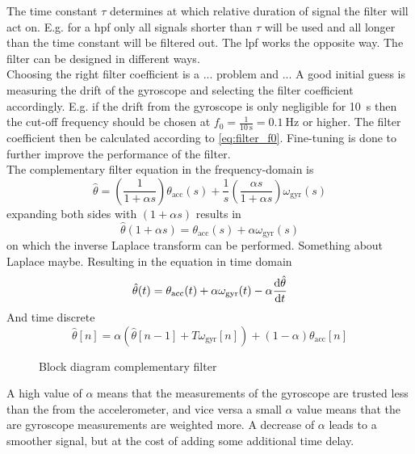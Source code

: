 The time constant $\tau$ determines at which relative duration of signal the filter will act on.
E.g. for a \gls{hpf} only all signals shorter than $\tau$ will be used and all longer than the time constant will be filtered out.
The \gls{lpf} works the opposite way.
The filter can be designed in different ways.\\
Choosing the right filter coefficient is a ... problem and ...
A good initial guess is measuring the drift of the gyroscope and selecting the filter coefficient accordingly.
E.g. if the drift from the gyroscope is only negligible for \SI{10}{\second} then the cut-off frequency should be chosen at $f_0 = \frac{1}{\SI{10}{\second}} = \SI{0.1}{\hertz}$ or higher.
The filter coefficient then be calculated according to \cref{eq:filter_f0}.
Fine-tuning is done to further improve the performance of the filter.\\
The complementary filter equation in the frequency-domain is
\begin{equation}
    \label{eq:compl_filt_f}
    \hat{\theta} = \left(\frac{1}{1 + \alpha s}\right)\theta_\mathrm{acc}(s) + \frac{1}{s}\left(\frac{\alpha s}{1 + \alpha s}\right) \omega_\mathrm{gyr}(s)
\end{equation}
expanding both sides with $(1 + \alpha s)$ results in
\begin{equation}
    \hat{\theta}(1 + \alpha s) = \theta_\mathrm{acc}(s) + \alpha\omega_\mathrm{gyr}(s)
\end{equation}
on which the inverse Laplace transform can be performed.
Something about Laplace maybe.
Resulting in the equation in time domain
\begin{equation}
    \hat{\theta}(t) = \theta_\mathrm{acc}(t) + \alpha\omega_\mathrm{gyr}(t) - \alpha \dv{\hat{\theta}}{t}
\end{equation}
And time discrete
\begin{equation}
    \hat{\theta}[n] = \alpha\left(\hat{\theta}[n - 1] + T \omega_\mathrm{gyr}[n]\right) + (1 - \alpha) \theta_\mathrm{acc}[n]
\end{equation}
\begin{figure}[htb]
    \centering
    
    \caption{Block diagram complementary filter}
    \label{fig:tikz_complementary_filter}
\end{figure}
A high value of $\alpha$ means that the measurements of the gyroscope are trusted less than the from the accelerometer, and vice versa a small $\alpha$ value means that the are gyroscope measurements are weighted more.
\cite{1997Baerveldt} \cite{2007Colton}
A decrease of $\alpha$ leads to a smoother signal, but at the cost of adding some additional time delay.


